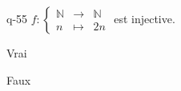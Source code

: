 \begin{truefalse}{q-55}
$f:\left\{\begin{array}{ccc}\mathbb{N} & \to & \mathbb{N} \\n & \mapsto & 2n\end{array}\right.$ est injective.
\item* Vrai
\item Faux
\end{truefalse}

